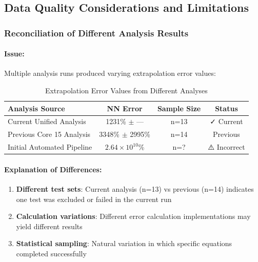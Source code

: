 
\subsection{Data Quality Considerations and Limitations}
\label{sec:data_quality}

\subsubsection{Reconciliation of Different Analysis Results}

\paragraph{Issue:} Multiple analysis runs produced varying extrapolation error values:

\begin{table}[htbp]
\centering
\caption{Extrapolation Error Values from Different Analyses}
\label{tab:error_reconciliation}
\begin{tabular}{@{}lccc@{}}
\toprule
\textbf{Analysis Source} & \textbf{NN Error} & \textbf{Sample Size} & \textbf{Status} \\
\midrule
Current Unified Analysis & 1231\% $\pm$ --- & n=13 & ✓ Current \\
Previous Core 15 Analysis & 3348\% $\pm$ 2995\% & n=14 & Previous \\
Initial Automated Pipeline & $2.64 \times 10^{10}$\% & n=? & ⚠️ Incorrect \\
\bottomrule
\end{tabular}
\end{table}

\paragraph{Explanation of Differences:}

\begin{enumerate}
    \item \textbf{Different test sets}: Current analysis (n=13) vs previous (n=14) indicates one test was excluded or failed in the current run

    \item \textbf{Calculation variations}: Different error calculation implementations may yield different results

    \item \textbf{Statistical sampling}: Natural variation in which specific equations completed successfully
\end{enumerate}


